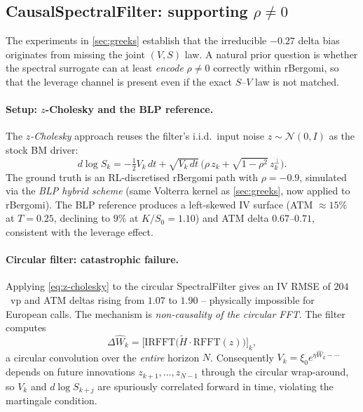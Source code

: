 \documentclass[11pt,a4paper]{article}
\begin{document}
\subsection{CausalSpectralFilter: supporting $\rho \neq 0$}
\label{sec:causal}

The experiments in \cref{sec:greeks} establish that the irreducible
$-0.27$ delta bias originates from missing the joint $(V,S)$ law. A
natural prior question is whether the spectral surrogate can at least
\emph{encode} $\rho \neq 0$ correctly within rBergomi, so that the
leverage channel is present even if the exact $S$--$V$ law is not matched.

\paragraph{Setup: $z$-Cholesky and the BLP reference.}
The \emph{$z$-Cholesky} approach reuses the filter's i.i.d.\ input noise
$z \sim \mathcal{N}(0,I)$ as the stock BM driver:
\begin{equation}
 d\!\log S_k
  = -\tfrac{1}{2}V_k\,dt
   + \sqrt{V_k\,dt}\,\bigl(\rho\,z_k + \sqrt{1-\rho^2}\,z_k^\perp\bigr).
 \label{eq:z-cholesky}
\end{equation}
The ground truth is an RL-discretised rBergomi path with $\rho = -0.9$,
simulated via the \emph{BLP hybrid scheme} \citep{bennedsen2017hybrid}
(same Volterra kernel as \cref{sec:greeks}, now applied to rBergomi).
The BLP reference produces a left-skewed IV surface (ATM $\approx 15\%$
at $T=0.25$, declining to $9\%$ at $K/S_0 = 1.10$) and ATM delta
$0.67$--$0.71$, consistent with the leverage effect.

\paragraph{Circular filter: catastrophic failure.}
Applying \eqref{eq:z-cholesky} to the circular SpectralFilter gives an
IV RMSE of $204$~vp and ATM deltas rising from $1.07$ to $1.90$ --
physically impossible for European calls. The mechanism is
\emph{non-causality of the circular FFT}. The filter computes
\[
 \Delta\hat{W}_k
  = \bigl[\mathrm{IRFFT}\!\bigl(\tilde{H}\cdot\mathrm{RFFT}(z)\bigr)\bigr]_k,
\]
a circular convolution over the \emph{entire} horizon $N$. Consequently
$V_k = \xi_0 e^{\eta\hat{W}_k - \cdots}$ depends on future innovations
$z_{k+1},\ldots,z_{N-1}$ through the circular wrap-around, so $V_k$ and
$d\!\log S_{k+j}$ are spuriously correlated forward in time, violating
the martingale condition.
\end{document}

